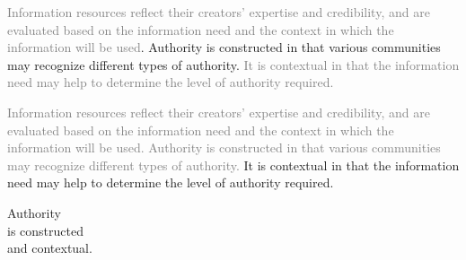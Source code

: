 \documentclass[17pt]{extarticle}
\begin{document}
{{\begin{center}
    \textcolor{gray}{Information resources reflect their creators’ expertise and credibility, and are evaluated based on the information need and the context in which the information will be used}. Authority is constructed in that various communities may recognize different types of authority. \textcolor{gray}{It is contextual in that the information need may help to determine the level of authority required.}

\end{center}

}

\newpage


\vspace*{1in}

{\LARGE

  \begin{center}

\textcolor{gray}{Information resources reflect their creators’ expertise and credibility, and are evaluated based on the information need and the context in which the information will be used. Authority is constructed in that various communities may recognize different types of authority.} It is contextual in that the information need may help to determine the level of authority required.

\end{center}

}

\newpage

\vspace*{1in}

{\Huge

\begin{center}

  Authority \\
  is constructed \\
  and contextual.

\end{center}

\newpage

}}
\end{document}

